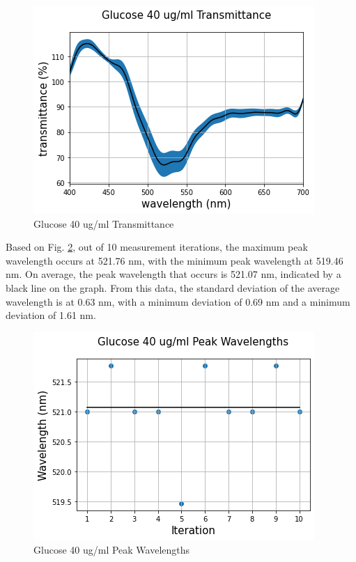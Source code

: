 \documentclass[conference]{IEEEtran}
\begin{document}
\begin{figure}[htbp]
    \centerline{\includegraphics[scale=0.5]{glucosetransmittanceALL.png}}
    \caption{Glucose 40 ug/ml Transmittance}
    \label{glucose_transmittance_all}
    \end{figure}

Based on Fig. \ref{glucose_peak_wavelength}, out of 10 measurement iterations, the maximum peak wavelength occurs at 521.76 nm, with the minimum peak wavelength at 519.46 nm.
On average, the peak wavelength that occurs is 521.07 nm, indicated by a black line on the graph.
From this data, the standard deviation of the average wavelength is at 0.63 nm, with a minimum deviation of 0.69 nm and a minimum deviation of 1.61 nm.

\begin{figure}[htbp]
    \centerline{\includegraphics[scale=0.5]{glucose_peakwavelength.png}}
    \caption{Glucose 40 ug/ml Peak Wavelengths}
    \label{glucose_peak_wavelength}
    \end{figure}
\end{document}
